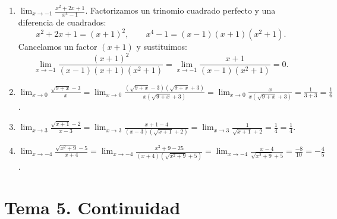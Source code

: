 \documentclass[12pt, letterpaper]{article}
\makeatletter
\renewcommand{\alph}[1]{\expandafter\@alphlatin\csname c@#1\endcsname}
\newcommand{\@alphlatin}[1]{\ifcase#1\or a\or b\or c\or d\or e\or f\or g\or h\or i\or j\or k\or l\or m\or n\or o\or p\or q\or r\or s\or t\or u\or v\or w\or x\or y\or z\else\@ctrerr\fi}
\makeatother
\begin{document}
\begin{enumerate}[label=\alph*)]
\[  \qquad
  x^3-1=(x-1)(x^2+x+1).
  \]
  \[
  \lim_{x\to1}\frac{x^4-1}{x^3-1}
  =\lim_{x\to1}\frac{(x+1)(x^2+1)}{x^2+x+1}
  =\frac{2(2)}3=\boxed{\frac43}.
  \]
  \item $\displaystyle\lim_{x\to-1}\frac{x^2+2x+1}{x^4-1}$. Factorizamos un trinomio cuadrado perfecto y una diferencia de cuadrados:
  \[
  x^2+2x+1=(x+1)^2,
  \qquad
  x^4-1=(x-1)(x+1)(x^2+1).
  \]
  Cancelamos un factor $(x+1)$ y sustituimos:
  \[
  \lim_{x\to-1}\frac{(x+1)^2}{(x-1)(x+1)(x^2+1)}
  =\lim_{x\to-1}\frac{x+1}{(x-1)(x^2+1)}
  =\boxed{0}.
  \]
  \item $\displaystyle
  \lim_{x\to0}\frac{\sqrt{9+x}-3}{x}
  =\lim_{x\to0}\frac{(\sqrt{9+x}-3)(\sqrt{9+x}+3)}
  {x(\sqrt{9+x}+3)}
  =\lim_{x\to0}\frac{x}{x(\sqrt{9+x}+3)}
  =\frac1{3+3}=\boxed{\frac16}$.
  \item $\displaystyle
  \lim_{x\to3}\frac{\sqrt{x+1}-2}{x-3}
  =\lim_{x\to3}\frac{x+1-4}{(x-3)(\sqrt{x+1}+2)}
  =\lim_{x\to3}\frac1{\sqrt{x+1}+2}
  =\frac14=\boxed{\frac14}$.
  \item $\displaystyle
  \lim_{x\to-4}\frac{\sqrt{x^2+9}-5}{x+4}
  =\lim_{x\to-4}\frac{x^2+9-25}
  {(x+4)(\sqrt{x^2+9}+5)}
  =\lim_{x\to-4}\frac{x-4}{\sqrt{x^2+9}+5}
  =\frac{-8}{10}=\boxed{-\frac45}$.
\end{enumerate}


\newpage
\section{Tema 5. Continuidad}
\end{document}
